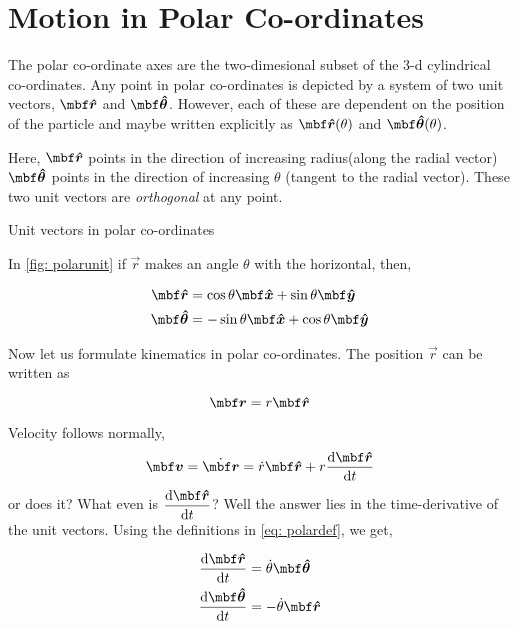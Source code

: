 \section{Motion in Polar Co-ordinates}

The polar co-ordinate axes are the two-dimesional subset of the 3-d cylindrical co-ordinates. 
Any point in polar co-ordinates is depicted by a system of two unit vectors, \(\unitv{r}\) and
\(\unitv{\theta}\). However, each of these are {dependent on the position of the particle} and
maybe written explicitly as \(\unitv{r}(\theta)\) and \(\unitv{\theta}(\theta)\).  

Here, \(\unitv{r}\) points in the direction of increasing radius(along the radial vector)
\(\unitv{\theta}\) points in the direction of increasing \(\theta\) (tangent to the radial vector).
These two unit vectors are \emph{orthogonal} at any point. 

\begin{marginfigure}
    \caption{Unit vectors in polar co-ordinates}
    \label{fig: polarunit}
\end{marginfigure}

In \cref{fig: polarunit} if \(\vec{r}\) makes
an angle \(\theta\) with the horizontal, then,

\begin{align}
    \label{eq: polardef}
    \unitv{r} &= \cos \theta \unitv{x} + \sin \theta \unitv{y}\\
    \unitv{\theta} &= -\sin \theta \unitv{x} + \cos \theta \unitv{y}
\end{align}

Now let us formulate kinematics in polar co-ordinates. The position \(\vec{r}\) can be written as

\begin{equation}
    \vec{r} = r \unitv{r}
\end{equation}

\noindent Velocity follows normally, 
\begin{equation}
    \vec{v} = \ndiv{\vec{r}} = \ndiv{r} \unitv{r} + r\dv{\unitv{r}}{t} 
\end{equation}
or does it? What even is \(\displaystyle\dv{\unitv{r}}{t}\)? Well the answer lies in 
the time-derivative of the unit vectors. Using the definitions in \eqref{eq: polardef}, we get,

\begin{align}
    \dv{\unitv{r}}{t} &= \ndiv{\theta} \unitv{\theta}\\
    \dv{\unitv{\theta}}{t} &= -\ndiv{\theta} \unitv{r}
\end{align}

